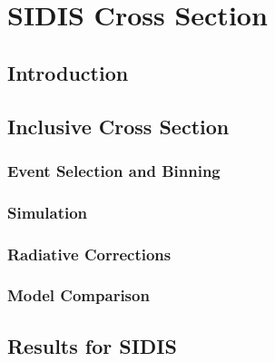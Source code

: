 \chapter{SIDIS Cross Section}

\section{Introduction}

\section{Inclusive Cross Section}
\subsection{Event Selection and Binning}
\subsection{Simulation}
\subsection{Radiative Corrections}
\subsection{Model Comparison}

\section{Results for SIDIS}

